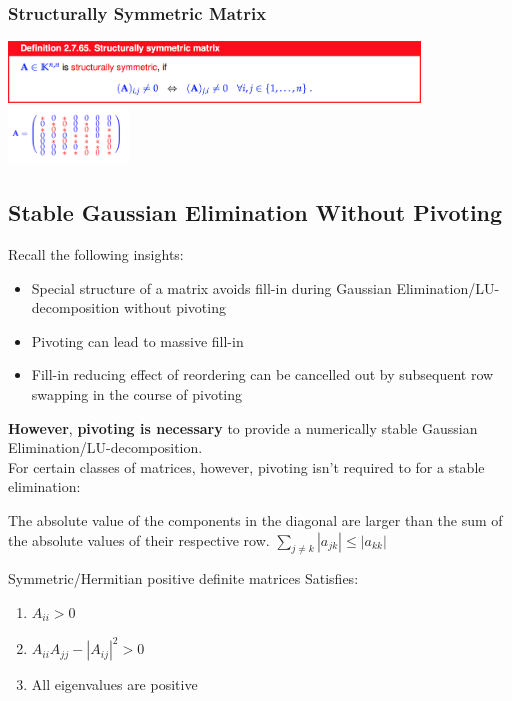 \documentclass[12pt, a4paper]{article}
\begin{document}
\subsubsection{Structurally Symmetric Matrix}

\begin{center}
	\includegraphics[width=310pt]{ssmatrix.png}
	\includegraphics[width=0.24\textwidth]{strucSymMatrix.png}
\end{center}

\subsection{Stable Gaussian Elimination Without Pivoting}

Recall the following insights:
\begin{itemize}[noitemsep]
	\item Special structure of a matrix avoids fill-in during Gaussian Elimination/LU-decomposition without pivoting
	\item Pivoting can lead to massive fill-in
	\item Fill-in reducing effect of reordering can be cancelled out by subsequent row swapping in the course of pivoting 
\end{itemize}

\textbf{However}, \textbf{pivoting is necessary} to provide a numerically stable Gaussian Elimination/LU-decomposition. \\

For certain classes of matrices, however, pivoting isn't required to for a stable elimination:

\begin{description}[labelindent=16pt,style=multiline,leftmargin=7cm, noitemsep]
	\item[Diagonally Dominant Matrix:] The absolute value of the components in the diagonal are larger than the sum of the absolute values of their respective row. $\sum_{j\neq k}|a_{jk}| \leq |a_{kk}|$
	\item[s.p.d. Matrix:] Symmetric/Hermitian positive definite matrices
	Satisfies:
	\begin{enumerate}[noitemsep]
		\item $A_{ii} > 0$
		\item $A_{ii}A_{jj} - |A_{ij}|^2 > 0$
		\item All eigenvalues are positive
	\end{enumerate}
\end{description}
\end{document}
